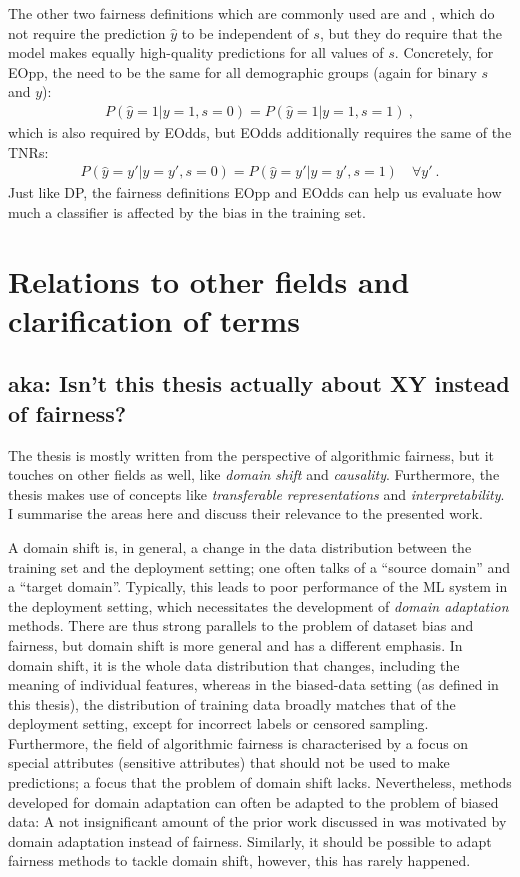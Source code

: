 The other two fairness definitions which are commonly used are  and ,
which do not require the prediction $\hat{y}$ to be independent of $s$,
but they do require that the model makes equally high-quality predictions for all values of $s$.
Concretely, for \ac{EOpp}, the  need to be the same for all demographic groups
(again for binary $s$ and $y$):
\begin{align}
  \label{eq:eopp-def}
  P(\hat{y}=1|y=1,s=0) = P(\hat{y}=1|y=1,s=1)~,
\end{align}
which is also required by \ac{EOdds}, but \ac{EOdds} additionally requires the same of the \acp{TNR}:
\begin{align}
  P(\hat{y}=y'|y=y',s=0) = P(\hat{y}=y'|y=y',s=1)\quad\forall y'~.
  \label{eq:eodds-def}
\end{align}
Just like \ac{DP},
the fairness definitions \ac{EOpp} and \ac{EOdds} can help us evaluate
how much a classifier is affected by the bias in the training set.

\section{Relations to other fields and clarification of terms}
\subsection{aka: Isn't this thesis actually about XY instead of fairness?}
The thesis is mostly written from the perspective of algorithmic fairness,
but it touches on other fields as well, like \emph{domain shift} and \emph{causality}.
Furthermore, the thesis makes use of concepts like \emph{transferable representations}
and \emph{interpretability}.
I summarise the areas here and discuss their relevance to the presented work.

A domain shift is, in general, a change in the data distribution between the training set and the deployment setting;
one often talks of a ``source domain'' and a ``target domain''.
Typically, this leads to poor performance of the \ac{ML} system in the deployment setting,
which necessitates the development of \emph{domain adaptation} methods.
There are thus strong parallels to the problem of dataset bias and fairness,
but domain shift is more general and has a different emphasis.
In domain shift, it is the whole data distribution that changes, including the meaning of individual features,
whereas in the biased-data setting (as defined in this thesis), the distribution of training data broadly matches that of the deployment setting, except for incorrect labels or censored sampling.
Furthermore, the field of algorithmic fairness is characterised by a focus on special attributes (sensitive attributes) that should not be used to make predictions;
a focus that the problem of domain shift lacks.
Nevertheless, methods developed for domain adaptation can often be adapted to the problem of biased data:
A not insignificant amount of the prior work discussed in  was motivated by domain adaptation instead of fairness.
Similarly, it should be possible to adapt fairness methods to tackle domain shift,
however, this has rarely happened.

